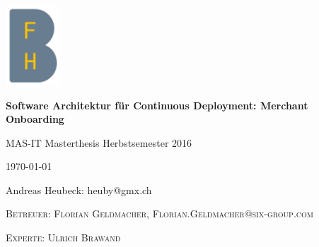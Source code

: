 \graphicspath{{./images/}}

\begin{titlepage}
	\raggedright
	\includegraphics[width=0.15\textwidth]{bfhlogo.png}\par\vspace{1cm}
	\vspace{2cm}
	{\huge\bfseries Software Architektur für Continuous Deployment: Merchant Onboarding\par}
	\vspace{2cm}
	{\large MAS-IT Masterthesis Herbstsemester 2016\par}
	\vspace{0.5cm}
	{\large \today\par}
	\vspace{0.5cm}
	{\large Andreas Heubeck: heuby@gmx.ch\par}
	\vfill
	\vspace{3cm}
	
	\textsc{Betreuer: Florian Geldmacher, Florian.Geldmacher@six-group.com}\par
	\textsc{Experte: Ulrich Brawand}

	\vfill

\end{titlepage}